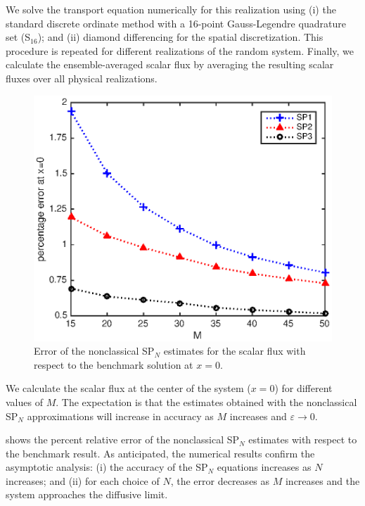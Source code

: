 \documentclass{anstrans}
\newcommand{\ep}{\varepsilon}
\begin{document}
We solve the transport equation numerically for this realization using (i) the standard discrete ordinate method with a 16-point Gauss-Legendre quadrature set (S$_{16}$); and (ii) diamond differencing for the spatial discretization.
This procedure is repeated for different realizations of the random system.
Finally, we calculate the ensemble-averaged scalar flux by averaging the resulting scalar fluxes over all physical realizations.
\begin{figure}[ht] %
  \centering
  \includegraphics[scale=0.75]{fig_spn}
  \caption{Error of the nonclassical SP$_N$ estimates for the scalar flux with respect to the benchmark solution at $x=0$.}
  \label{fig}
\end{figure}

We calculate the scalar flux at the center of the system ($x=0$) for different values of $M$. 
The expectation is that the estimates obtained with the nonclassical SP$_N$ approximations will increase in accuracy as $M$ increases and $\ep\rightarrow 0$.

 shows the percent relative error of the nonclassical SP$_N$ estimates with respect to the benchmark result.
As anticipated, the numerical results confirm the asymptotic analysis: (i) the accuracy of the SP$_N$ equations increases as $N$ increases; and (ii) for each choice of $N$, the error decreases as $M$ increases and the system approaches the diffusive limit.


\end{document}
